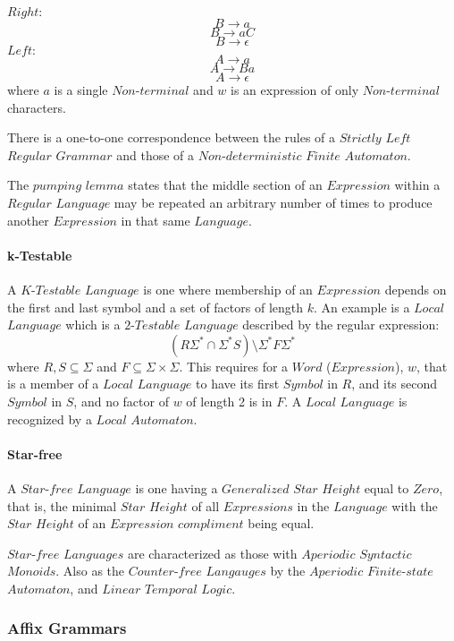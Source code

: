 \documentclass{article}
\begin{document}
    $Right:$
    \[
        B \rightarrow a
    \]\[
        B \rightarrow aC
    \]\[
        B \rightarrow \epsilon
    \]
    $Left:$
    \[
        A \rightarrow a
    \]\[
        A \rightarrow Ba
    \]\[
        A \rightarrow \epsilon
    \]
    where $a$ is a single $Non$-$terminal$ and $w$ is an expression of
    only $Non$-$terminal$ characters.

    There is a one-to-one correspondence between the rules of a
    $Strictly$ $Left$ $Regular$ $Grammar$ and those of a
    $Non$-$deterministic$ $Finite$ $Automaton$.

    The $pumping$ $lemma$ states that the middle section of an
    $Expression$ within a $Regular$ $Language$ may be repeated an
    arbitrary number of times to produce another $Expression$ in that
    same $Language$.

    \paragraph{k-Testable}
    A $K$-$Testable$ $Language$ is one where membership of an
    $Expression$ depends on the first and last symbol and a set of
    factors of length $k$. An example is a $Local$ $Language$ which is
    a $2$-$Testable$ $Language$ described by the regular expression:
    \[
        (R\Sigma^* \cap \Sigma^*S)\setminus\Sigma^*F\Sigma^*
    \]
    where $R,S \subseteq \Sigma$ and $F \subseteq \Sigma \times
    \Sigma$. This requires for a $Word$ ($Expression$), $w$, that is a
    member of a $Local$ $Language$ to have its first $Symbol$ in $R$,
    and its second $Symbol$ in $S$, and no factor of $w$ of length 2
    is in $F$. A $Local$ $Language$ is recognized by a $Local$
    $Automaton$.

    \paragraph{Star-free}
    A $Star$-$free$ $Language$ is one having a $Generalized$ $Star$
    $Height$ equal to $Zero$, that is, the minimal $Star$ $Height$ of
    all $Expressions$ in the $Language$ with the $Star$ $Height$ of an
    $Expression$ $compliment$ being equal.

    $Star$-$free$ $Languages$ are characterized as those with
    $Aperiodic$ $Syntactic$ $Monoids$. Also as the $Counter$-$free$
    $Langauges$ by the $Aperiodic$ $Finite$-$state$ $Automaton$, and
    $Linear$ $Temporal$ $Logic$.

\subsubsection{Affix Grammars}
\end{document}

